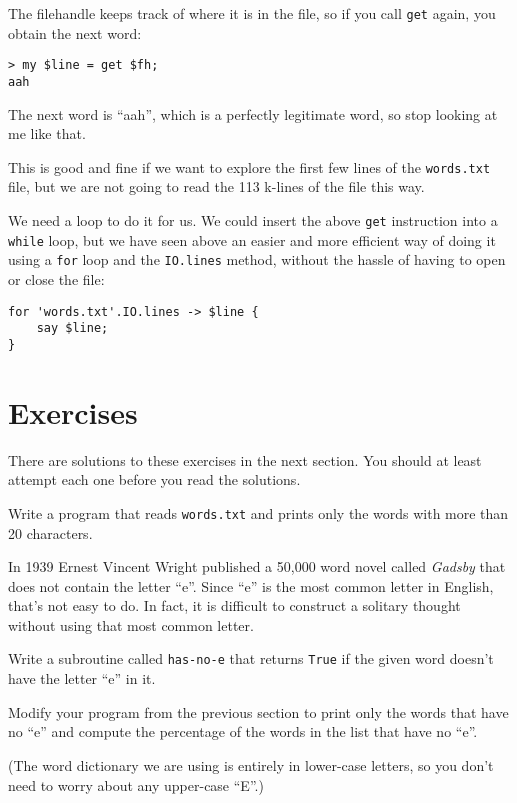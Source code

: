 The filehandle keeps track of where it is in the file, so
if you call {\tt get} again, you obtain the next word:

\begin{verbatim}
> my $line = get $fh;
aah
\end{verbatim}
%
The next word is ``aah'', which is a perfectly legitimate
word, so stop looking at me like that.

This is good and fine if we want to explore the first few 
lines of the {\tt words.txt} file, but we are not going to 
read the 113 k-lines of the file this way.

We need a loop to do it for us. We could insert the above 
{\tt get} instruction into a {\tt while} loop, but we have 
seen above an easier and more efficient way of doing it 
using a {\tt for} loop and the {\tt IO.lines} method, 
without the hassle of having to open or close the file:

\begin{verbatim}
for 'words.txt'.IO.lines -> $line {
    say $line;
}
\end{verbatim}
%

\section{Exercises}

There are solutions to these exercises in the next section.
You should at least attempt each one before you read the solutions.

\begin{exercise}
Write a program that reads {\tt words.txt} and prints only the
words with more than 20 characters.

\end{exercise}

\begin{exercise}

In 1939 Ernest Vincent Wright published a 50,000 word novel 
called {\em Gadsby} that does not contain the letter ``e''. 
Since ``e'' is the most common letter in English, that's 
not easy to do. In fact, it is difficult to construct a 
solitary thought without using that most common letter.

Write a subroutine called \verb"has-no-e" that returns 
{\tt True} if the given word doesn't have the letter ``e'' 
in it.
\label{no_e}

Modify your program from the previous section to print only 
the words that have no ``e'' and compute the percentage of 
the words in the list that have no ``e''.

(The word dictionary we are using is entirely in lower-case 
letters, so you don't need to worry about any upper-case 
``E''.)


\end{exercise}


